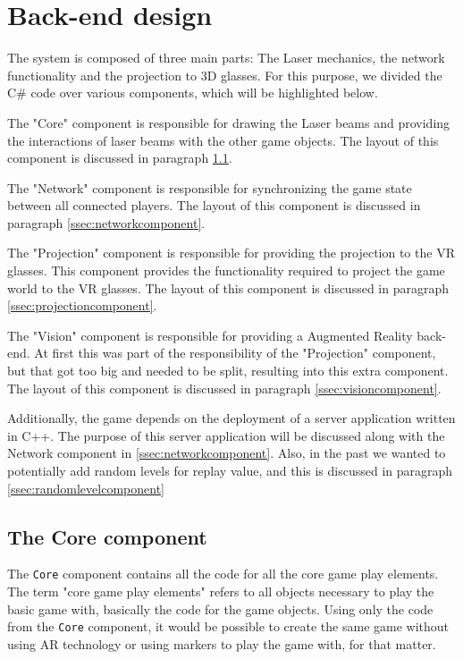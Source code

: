 	\section{Back-end design} \label{sec:backenddesign}
		The system is composed of three main parts: The Laser mechanics, the network
		functionality and the projection to 3D glasses. For this purpose, we divided
		the C\# code over various components, which will be highlighted below.

		The "Core" component is responsible for drawing the Laser beams and
		providing the interactions of laser beams with the other game objects.
		The layout of this component is discussed in paragraph 
		\ref{ssec:corecomponent}.

		The "Network" component is responsible for synchronizing the game state
		between all connected players. The layout of this component is discussed 
		in paragraph \ref{ssec:networkcomponent}.

		The "Projection" component is responsible for providing the projection to
		the VR glasses. This component provides the functionality required to project
		the game world to the VR glasses. The layout of this component is discussed in
		paragraph \ref{ssec:projectioncomponent}.
		
		The "Vision" component is responsible for providing a Augmented Reality back-end.
		At first this was part of the responsibility of the "Projection"
		component, but that got too big and needed to be split,
		resulting into this extra component. The layout of this component is
		discussed in paragraph \ref{ssec:visioncomponent}.
        
        
		
		Additionally, the game depends on the deployment of a server application
		written in C++. The purpose of this server application will be discussed 
		along with the Network component in \ref{ssec:networkcomponent}. Also,
		in the past we wanted to potentially add random levels for replay value,
		and this is discussed in paragraph \ref{ssec:randomlevelcomponent}
		
		\subsection{The Core component} \label{ssec:corecomponent}
			The \texttt{Core} component contains all the code for all the core game play
			elements. The term "core game play elements" refers to all objects 
			necessary to play the basic game with, basically the code
			for the game objects. Using only the code from the \texttt{Core} component,
			it would be possible to create the same game without using AR
			technology or using markers to play the game with, for that matter.
			
